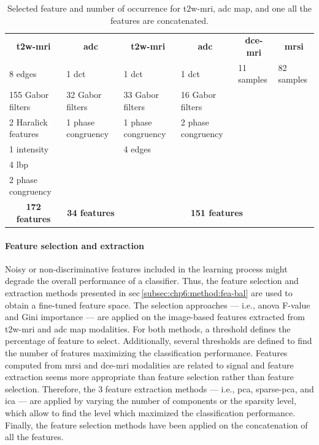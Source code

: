 \begin{landscape}
\begin{table}
  \caption{Selected feature and number of occurrence for \acs*{t2w}-\acs*{mri}, \acs*{adc} map, and one all the features are concatenated.}
  \centering
  \scriptsize
  \begin{tabular}{llllll}
    \toprule
    \multicolumn{1}{c}{\textbf{\acs*{t2w}-\acs*{mri}}} & \multicolumn{1}{c}{\textbf{\acs*{adc}}} & \multicolumn{1}{c}{\textbf{\acs*{t2w}-\acs*{mri}}} & \multicolumn{1}{c}{\textbf{\acs*{adc}}} & \multicolumn{1}{c}{\textbf{\acs*{dce}-\acs*{mri}}} & \multicolumn{1}{c}{\textbf{\acs*{mrsi}}} \\
    \cmidrule(lr){1-1} \cmidrule(lr){2-2} \cmidrule(lr){3-6}
    8 edges & 1 \acs*{dct} & 1 \acs*{dct} & 1 \acs*{dct} & 11 samples  & 82 samples \\
    155 Gabor filters & 32 Gabor filters & 33 Gabor filters & 16 Gabor filters & & \\ 
    2 Haralick features & 1 phase congruency & 1 phase congruency & 2 phase congruency & & \\
    1 intensity & & 4 edges & & & \\
    4 \acs*{lbp} & & & & & \\
    2 phase congruency & & & & & \\
    \cmidrule(lr){1-1} \cmidrule(lr){2-2} \cmidrule(lr){3-6}
    \multicolumn{1}{c}{\textbf{172 features}} & \multicolumn{1}{c}{\textbf{34 features}} & \multicolumn{4}{c}{\textbf{151 features}} \\
    \bottomrule
  \end{tabular}
  \label{tab:selfeatocc}
\end{table}

\end{landscape}

\paragraph{Feature selection and extraction}

Noisy or non-discriminative features included in the learning process might degrade the overall performance of a classifier.
Thus, the feature selection and extraction methods presented in \acs{sec}\,\ref{subsec:chp6:method:fea-bal} are used to obtain a fine-tuned feature space.
The selection approaches --- i.e., \ac{anova} F-value and Gini importance --- are applied on the image-based features extracted from \ac{t2w}-\ac{mri} and \ac{adc} map modalities.
For both methods, a threshold defines the percentage of feature to select.
Additionally, several thresholds are defined to find the number of features maximizing the classification performance.
Features computed from \ac{mrsi} and \ac{dce}-\ac{mri} modalities are related to signal and feature extraction seems more appropriate than feature selection rather than feature selection.
Therefore, the 3 feature extraction methods --- i.e., \ac{pca}, sparse-\ac{pca}, and \ac{ica} --- are applied by varying the number of components or the sparsity level, which allow to find the level which maximized the classification performance.
Finally, the feature selection methods have been applied on the concatenation of all the features.


